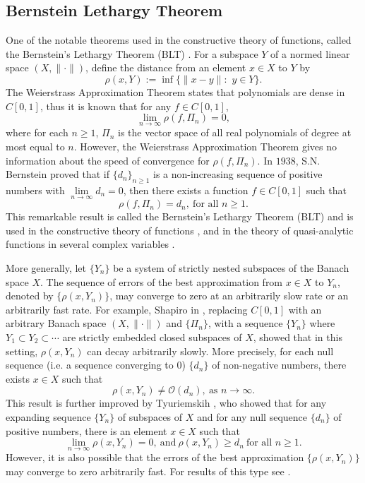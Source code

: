 \documentclass[12pt, reqno]{amsart}
\theoremstyle{definition}
\theoremstyle{remark}
\numberwithin{equation}{section}
\begin{document}
\subsection{Bernstein Lethargy Theorem}
 One of the notable theorems used in the constructive theory of functions, called the Bernstein's Lethargy Theorem (BLT) \cite{Bernstein}. For a subspace $Y$ of a normed linear space $(X,\|\cdot\|)$,  define the distance from an element $x \in X$ to $Y$ by
$$\rho(x, Y):= \inf \{ \|x-y\|: \,\,y\in Y\}.$$
The Weierstrass Approximation Theorem states that polynomials are dense in $C[0,1]$, thus it is known that for any $f\in C[0,1]$, $$\displaystyle \lim_{n \to \infty} \rho(f, \Pi_n) = 0,$$
where for each $n\ge1$,  $\Pi_n$ is the vector space of all real polynomials of degree at most equal to $n$.
However, the Weierstrass Approximation Theorem gives no information about the speed of convergence for $\rho(f, \Pi_n)$. In $1938$, S.N. Bernstein \cite{Bernstein} proved that if $\{d_n \}_{n\ge1}$ is a non-increasing  sequence  of positive numbers with $\lim\limits_{n\to\infty}d_n=0$, then there exists a function $f\in C[0,1]$ such that
$$\rho(f, \Pi_n)= d_n,~\mbox{for all $n \ge1$}.$$
This remarkable result is called the Bernstein's Lethargy Theorem (BLT) and is used in the constructive theory of functions \cite{Sin}, and  in the theory of quasi-analytic functions in several complex variables \cite{Ple2}.

More generally, let $\{Y_n\}$ be a system of strictly nested subspaces of the Banach space $X$. The sequence of errors of the best approximation from $x\in X$ to $Y_n$, denoted by $\{\rho(x,Y_n)\}$, may converge to zero at an arbitrarily slow rate  or an arbitrarily fast rate. For example, Shapiro in \cite{Sha}, replacing $C[0,1]$ with an arbitrary Banach space $(X, \|\cdot\|)$ and $\{\Pi_n\}$, with a sequence $\{Y_n\}$ where $Y_1 \subset Y_2 \subset \cdots$ are strictly embedded closed subspaces of $X$, showed that in this setting, $\rho(x, Y_n)$ can decay arbitrarily slowly. More precisely, for each null sequence (i.e. a sequence converging to $0$) $\{d_n\}$ of non-negative numbers, there exists $x\in X$ such that
\begin{equation*}
\label{Shap}
 \rho(x, Y_n) \neq \mathcal O (d_n),~\mbox{as $n\to\infty$}.
 \end{equation*}
 This result is further improved  by Tyuriemskih \cite{Tyu}, who showed that for any expanding sequence $\{Y_n\}$ of subspaces of $X$ and for any null sequence $\{d_n\}$ of positive numbers, there is an element $x\in X$  such that
 \begin{equation*}
 \label{tyu}
 \lim_{n \rightarrow \infty} \rho(x, Y_n) =0,~\mbox{and}~\rho(x, Y_n) \geq d_n~\mbox{for all $n\ge1$}.
   \end{equation*}
   However, it is also possible that the errors of the best approximation $\{\rho(x,Y_n)\}$ may converge to zero arbitrarily fast. For results of this type see   \cite{Al-To}.
\end{document}
